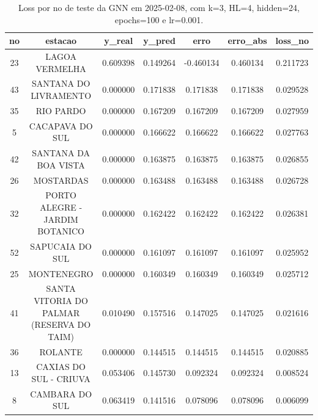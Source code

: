 \begin{table}[h]
\centering
\caption{Loss por no de teste da GNN em 2025-02-08, com k=3, HL=4, hidden=24, epochs=100 e lr=0.001.}
\label{tab:gnn_loss_k3_hl4_h24_e100_d20250208}
\begin{tabular}{ccccccc}
\toprule
no & estacao & y\_real & y\_pred & erro & erro\_abs & loss\_no \\
\midrule
23 & LAGOA VERMELHA & 0.609398 & 0.149264 & -0.460134 & 0.460134 & 0.211723 \\
43 & SANTANA DO LIVRAMENTO & 0.000000 & 0.171838 & 0.171838 & 0.171838 & 0.029528 \\
35 & RIO PARDO & 0.000000 & 0.167209 & 0.167209 & 0.167209 & 0.027959 \\
5 & CACAPAVA DO SUL & 0.000000 & 0.166622 & 0.166622 & 0.166622 & 0.027763 \\
42 & SANTANA DA BOA VISTA & 0.000000 & 0.163875 & 0.163875 & 0.163875 & 0.026855 \\
26 & MOSTARDAS & 0.000000 & 0.163488 & 0.163488 & 0.163488 & 0.026728 \\
32 & PORTO ALEGRE - JARDIM BOTANICO & 0.000000 & 0.162422 & 0.162422 & 0.162422 & 0.026381 \\
52 & SAPUCAIA DO SUL & 0.000000 & 0.161097 & 0.161097 & 0.161097 & 0.025952 \\
25 & MONTENEGRO & 0.000000 & 0.160349 & 0.160349 & 0.160349 & 0.025712 \\
41 & SANTA VITORIA DO PALMAR (RESERVA DO TAIM) & 0.010490 & 0.157516 & 0.147025 & 0.147025 & 0.021616 \\
36 & ROLANTE & 0.000000 & 0.144515 & 0.144515 & 0.144515 & 0.020885 \\
13 & CAXIAS DO SUL - CRIUVA & 0.053406 & 0.145730 & 0.092324 & 0.092324 & 0.008524 \\
8 & CAMBARA DO SUL & 0.063419 & 0.141516 & 0.078096 & 0.078096 & 0.006099 \\
\bottomrule
\end{tabular}
\end{table}
